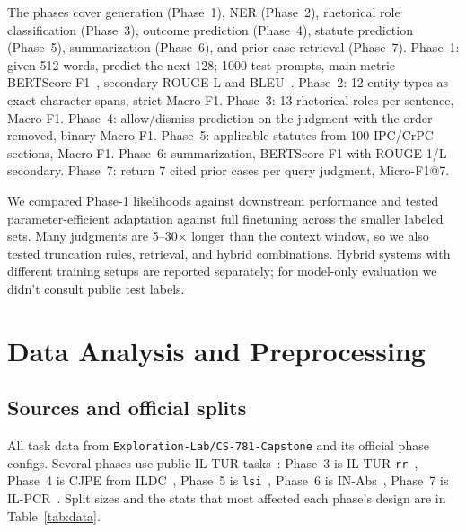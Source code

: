\documentclass[11pt, oneside]{article}
\begin{document}
The phases cover generation (Phase~1), NER (Phase~2), rhetorical role classification (Phase~3),
outcome prediction (Phase~4), statute prediction (Phase~5), summarization (Phase~6), and prior case
retrieval (Phase~7). Phase~1: given 512 words, predict the next 128; 1000 test prompts, main metric
BERTScore F1~\citep{zhang2020bertscore}, secondary ROUGE-L and BLEU~\citep{lin2004rouge,papineni2002bleu}.
Phase~2: 12 entity types as exact character spans, strict Macro-F1. Phase~3: 13 rhetorical roles per
sentence, Macro-F1. Phase~4: allow/dismiss prediction on the judgment with the order removed, binary
Macro-F1. Phase~5: applicable statutes from 100 IPC/CrPC sections, Macro-F1. Phase~6: summarization,
BERTScore F1 with ROUGE-1/L secondary. Phase~7: return 7 cited prior cases per query judgment,
Micro-F1@7.

We compared Phase-1 likelihoods against downstream performance and tested parameter-efficient
adaptation against full finetuning across the smaller labeled sets. Many judgments are 5--30$\times$
longer than the context window, so we also tested truncation rules, retrieval, and hybrid
combinations. Hybrid systems with different training setups are reported separately; for model-only
evaluation we didn't consult public test labels.

\section{Data Analysis and Preprocessing}
\subsection{Sources and official splits}
All task data from \texttt{Exploration-Lab/CS-781-Capstone} and its official phase configs. Several
phases use public IL-TUR tasks~\citep{joshi2024iltur}: Phase~3 is IL-TUR \texttt{rr}~\citep{malik2022rr},
Phase~4 is CJPE from ILDC~\citep{malik2021ildc}, Phase~5 is \texttt{lsi}~\citep{paul2022lesicin},
Phase~6 is IN-Abs~\citep{shukla2022summ}, Phase~7 is IL-PCR~\citep{joshi2023ilpcr}. Split sizes and the
stats that most affected each phase's design are in Table~\ref{tab:data}.
\end{document}
